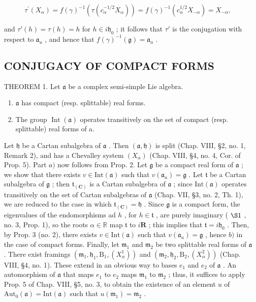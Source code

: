 \[
\tau^ {\prime} (X _ {\alpha}) = f (\gamma) ^ {- 1} (\tau (c _ {\alpha} ^ {- 1 / 2} X _ {\alpha})) = f (\gamma) ^ {- 1} (c _ {\alpha} ^ {1 / 2} X _ {- \alpha}) = X _ {- \alpha},
\]

and \(\tau'(h) = \tau(h) = h\) for \(h \in i\mathfrak{h}_0\) ; it follows that \(\tau'\) is the conjugation with respect to \(\mathfrak{a}_u\) , and hence that \(f(\gamma)^{-1}(\mathfrak{g}) = \mathfrak{a}_u\) .

\subsection{CONJUGACY OF COMPACT FORMS}

THEOREM 1. Let \(\mathfrak{a}\) be a complex semi-simple Lie algebra.

\begin{enumerate}
\def\labelenumi{\alph{enumi})}
\item
  \(\mathfrak{a}\) has compact (resp. splittable) real forms.
\item
  The group \(\operatorname{Int}(\mathfrak{a})\) operates transitively on the set of compact (resp. splittable) real forms of a.
\end{enumerate}

Let \(\mathfrak{h}\) be a Cartan subalgebra of \(\mathfrak{a}\) . Then \((\mathfrak{a},\mathfrak{h})\) is split (Chap. VIII, §2, no. 1, Remark 2), and has a Chevalley system \((X_{\alpha})\) (Chap. VIII, §4, no. 4, Cor. of Prop. 5). Part \(a)\) now follows from Prop. 2. Let \(\mathfrak{g}\) be a compact real form of \(\mathfrak{a}\) ; we show that there exists \(v\in\mathrm{Int}(\mathfrak{a})\) such that \(v(\mathfrak{a}_{u})=\mathfrak{g}\) . Let \(\mathfrak{t}\) be a Cartan subalgebra of \(\mathfrak{g}\) ; then \(\mathfrak{t}_{(\mathbf{C})}\) is a Cartan subalgebra of \(\mathfrak{a}\) ; since \(\mathrm{Int}(\mathfrak{a})\) operates transitively on the set of Cartan subalgebras of \(\mathfrak{a}\) (Chap. VII, §3, no. 2, Th. 1), we are reduced to the case in which \(\mathfrak{t}_{(\mathbf{C})}=\mathfrak{h}\) . Since \(\mathfrak{g}\) is a compact form, the eigenvalues of the endomorphisms ad \(h\) , for \(h\in\mathfrak{t}\) , are purely imaginary ( \(\S1\) , no. 3, Prop. 1), so the roots \(\alpha\in\mathbb{R}\) map \(\mathfrak{t}\) to \(i\mathbf{R}\) ; this implies that \(\mathfrak{t}=i\mathfrak{h}_{0}\) . Then, by Prop. 3 (no. 2), there exists \(v\in\mathrm{Int}(\mathfrak{a})\) such that \(v(\mathfrak{a}_{u})=\mathfrak{g}\) , hence \(b)\) in the case of compact forms. Finally, let \(\mathfrak{m}_{1}\) and \(\mathfrak{m}_{2}\) be two splittable real forms of \(\mathfrak{a}\) . There exist framings \((\mathfrak{m}_{1},\mathfrak{h}_{1},\mathrm{B}_{1},(X_{\alpha}^{1}))\) and \((\mathfrak{m}_{2},\mathfrak{h}_{2},\mathrm{B}_{2},(X_{\alpha}^{2}))\) (Chap. VIII, §4, no. 1). These extend in an obvious way to bases \(e_{1}\) and \(e_{2}\) of \(\mathfrak{a}\) . An automorphism of \(\mathfrak{a}\) that maps \(e_{1}\) to \(e_{2}\) maps \(\mathfrak{m}_{1}\) to \(\mathfrak{m}_{2}\) ; thus, it suffices to apply Prop. 5 of Chap. VIII, §5, no. 3, to obtain the existence of an element \(u\) of \(\mathrm{Aut}_{0}(\mathfrak{a})=\mathrm{Int}(\mathfrak{a})\) such that \(u(\mathfrak{m}_{1})=\mathfrak{m}_{2}\) .

